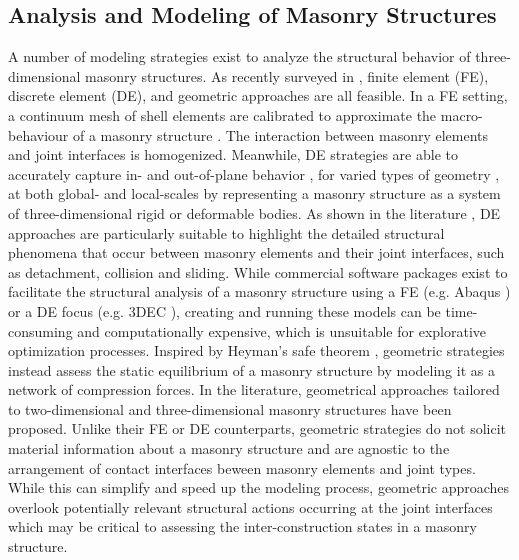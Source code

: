\subsection{Analysis and Modeling of Masonry Structures}\label{sec:2_analysis}
A number of modeling strategies exist to analyze the structural behavior of three-dimensional masonry structures. As recently surveyed in \cite{sarhosis_review_2016,daltri_modeling_2020, fang_assessing_2019}, finite element (FE), discrete element (DE), and geometric approaches are all feasible. In a FE setting, a continuum mesh of shell elements are calibrated to approximate the macro-behaviour of a masonry structure \cite{kaminski_tests_2010, sarhosis_review_2016}. The interaction between masonry elements and joint interfaces is homogenized. Meanwhile, DE strategies are able to accurately capture in- and out-of-plane behavior \cite{pulatsu_-plane_2019, pulatsu_comparison_2019}, for varied types of geometry \cite{mcinerney_discrete_2015, foti_dem_2018}, at both global- and local-scales \cite{thavalingam_computational_2001,simon_discrete_2016, cundall_formulation_1988, hart_formulation_1988} by representing a masonry structure as a system of three-dimensional rigid or deformable bodies. As shown in the literature \cite{roberti_distinct_1998, kassotakis_discrete_2017, meriggi_distinct_2019, michiels_comparison_2017}, DE approaches are particularly suitable to highlight the detailed structural phenomena that occur between masonry elements and their joint interfaces, such as detachment, collision and sliding. While commercial software packages exist to facilitate the structural analysis of a masonry structure using a FE (e.g. Abaqus \cite{abaqus_inc_abaqus_2020}) or a DE focus (e.g. 3DEC \cite{itasca_consulting_group_inc_3dec_2016}), creating and running these models can be time-consuming and computationally expensive, which is unsuitable for explorative optimization processes. Inspired by Heyman's safe theorem \cite{heyman_stone_1966, heyman_stone_1997}, geometric strategies instead assess the static equilibrium of a masonry structure by modeling it as a network of compression forces. In the literature, geometrical approaches tailored to two-dimensional \cite{block_as_2006, lau_equilibrium_2006, michiels_form-finding_2018} and three-dimensional masonry structures \cite{odwyer_funicular_1999, block_thrust_2007, vouga_design_2012} have been proposed. Unlike their FE or DE counterparts, geometric strategies do not solicit material information about a masonry structure and are agnostic to the arrangement of contact interfaces beween masonry elements and joint types. While this can simplify and speed up the modeling process, geometric approaches overlook potentially relevant structural actions occurring at the joint interfaces which may be critical to assessing the inter-construction states in a masonry structure.

